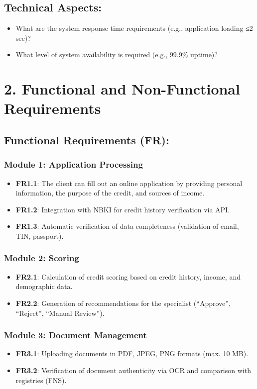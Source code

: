 \documentclass[a4paper,12pt]{article}
\begin{document}
\subsection*{Technical Aspects:}
\begin{itemize}
    \item What are the system response time requirements (e.g., application loading ≤2 sec)?
    \item What level of system availability is required (e.g., 99.9\% uptime)?
\end{itemize}

\section*{2. Functional and Non-Functional Requirements}

\subsection*{Functional Requirements (FR):}
\subsubsection*{Module 1: Application Processing}
\begin{itemize}
    \item \textbf{FR1.1}: The client can fill out an online application by providing personal information, the purpose of the credit, and sources of income.
    \item \textbf{FR1.2}: Integration with NBKI for credit history verification via API.
    \item \textbf{FR1.3}: Automatic verification of data completeness (validation of email, TIN, passport).
\end{itemize}

\subsubsection*{Module 2: Scoring}
\begin{itemize}
    \item \textbf{FR2.1}: Calculation of credit scoring based on credit history, income, and demographic data.
    \item \textbf{FR2.2}: Generation of recommendations for the specialist (“Approve”, “Reject”, “Manual Review”).
\end{itemize}

\subsubsection*{Module 3: Document Management}
\begin{itemize}
    \item \textbf{FR3.1}: Uploading documents in PDF, JPEG, PNG formats (max. 10 MB).
    \item \textbf{FR3.2}: Verification of document authenticity via OCR and comparison with registries (FNS).
\end{itemize}
\end{document}
